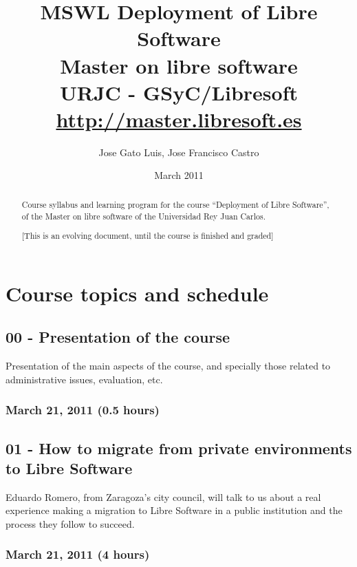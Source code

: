 \documentclass[a4paper]{article}
\title{MSWL Deployment of Libre Software \\
Master on libre software \\
URJC - GSyC/Libresoft \\
\url{http://master.libresoft.es}}
\author{Jose Gato Luis, Jose Francisco Castro}
\date{March 2011}
\begin{document}
\maketitle

\begin{abstract}
Course syllabus and learning program for the course ``Deployment of Libre Software'', of the Master on libre software of the
Universidad Rey Juan Carlos.

[This is an evolving document, until the course is finished and graded]
\end{abstract}

\tableofcontents

\section{Course topics and schedule}

\subsection{00 - Presentation of the course}

Presentation of the main aspects of the course, and specially those
related to administrative issues, evaluation, etc.

\subsubsection{March 21, 2011 (0.5 hours)}

\subsection{01 - How to migrate from private environments to Libre Software}

Eduardo Romero, from Zaragoza's city council, will talk to us about a real experience making a migration to Libre Software in a public institution and the process they follow to succeed. 

\subsubsection{March 21, 2011 (4 hours)}
\end{document}
